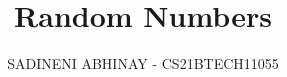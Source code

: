\documentclass[journal,12pt,twocolumn]{IEEEtran}
\begin{document}

\makeatletter
{}
\makeatother

\let\StandardTheFigure\thefigure
\let\StandardTheTable\thetable
\let\vec\mathbf
{}

\vspace{3cm}


\title{%
	{
	Random Numbers
	}
}


%
%
%


\author{ SADINENI ABHINAY - CS21BTECH11055}

% 
%
\end{document}
